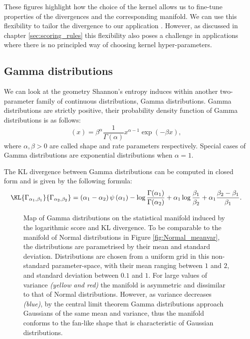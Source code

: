These figures highlight how the choice of the kernel allows us to fine-tune properties of the divergences and the corresponding manifold. We can use this flexibility to tailor the divergence to our application \citep{Song2008}. However, as discussed in chapter \ref{sec:scoring_rules} this flexibility also poses a challenge in applications where there is no principled way of choosing kernel hyper-parameters.

\subsection{Gamma distributions}

We can look at the geometry Shannon's entropy induces within another two-parameter family of continuous distributions, Gamma distributions. Gamma distributions are strictly positive, their probability density function of Gamma distributions is as follows:
%
\begin{equation}
(x) = \beta^{\alpha}\frac{1}{\Gamma(\alpha)} x^{\alpha-1} \exp(-\beta x),
\end{equation}
%
where $\alpha,\beta > 0$ are called shape and rate parameters respectively. Special cases of Gamma distributions are exponential distributions when $\alpha=1$.

The KL divergence between Gamma distributions can be computed in closed form and is given by the following formula:
%
\begin{equation}
	\KL{\Gamma_{\alpha_1,\beta_1}}{\Gamma_{\alpha_2,\beta_2}} = \left(\alpha_1 - \alpha_2\right)\psi\left(\alpha_1\right) - \log\frac{\Gamma(\alpha_1)}{\Gamma(\alpha_2)} + \alpha_1\log\frac{\beta_1}{\beta_2} + \alpha_1\frac{\beta_2 - \beta_1}{\beta_1}. \label{eqn:KL_Gamma}
\end{equation}

\begin{figure}[t] %
	\begin{center}
	\end{center}
	\caption[Map of Gamma distributions using the logarithmic score]{Map of Gamma distributions on the statistical manifold induced by the logarithmic score and KL divergence. To be comparable to the manifold of Normal distributions in Figure \ref{fig:Normal_meanvar}, the distributions are parametrised by their mean and standard deviation. Distributions are chosen from a uniform grid in this non-standard parameter-space, with their mean ranging between $1$ and $2$, and standard deviation between $0.1$ and $1$. For large values of variance \emph{(yellow and red)} the manifold is asymmetric and dissimilar to that of Normal distributions. However, as variance decreases \emph{(blue)}, by the central limit theorem Gamma distributions approach Gaussians of the same mean and variance, thus the manifold conforms to the fan-like shape that is characteristic of Gaussian distributions.\label{fig:Gamma_meanvar}}
\end{figure}


